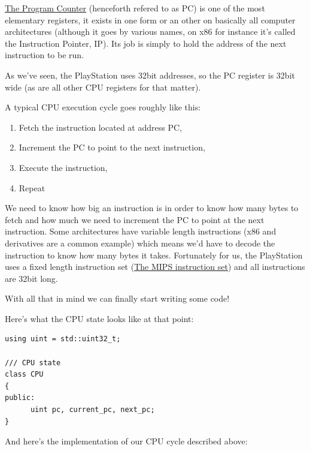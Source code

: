 \documentclass[a4paper]{article}
\begin{document}
\href{https://en.wikipedia.org/wiki/Program_counter}{The Program
  Counter} (henceforth refered to as PC) is one of the most
elementary registers, it exists in one form or an other on basically
all computer architectures (although it goes by various names, on x86
for instance it's called the Instruction Pointer, IP). Its
job is simply to hold the address of the next instruction to be run.

As we've seen, the PlayStation uses 32bit addresses, so the PC
register is 32bit wide (as are all other CPU registers for that
matter).

A typical CPU execution cycle goes roughly like this:

\begin{enumerate}
  \item Fetch the instruction located at address PC,
  \item Increment the PC to point to the next instruction,
  \item Execute the instruction,
  \item Repeat
\end{enumerate}

We need to know how big an instruction is in order to know how many
bytes to fetch and how much we need to increment the PC to
point at the next instruction. Some architectures have variable length
instructions (x86 and derivatives are a common example) which means
we'd have to decode the instruction to know how many bytes it
takes. Fortunately for us, the PlayStation uses a fixed length
instruction set
(\href{https://en.wikipedia.org/wiki/MIPS_instruction_set}{The MIPS
  instruction set}) and all instructions are 32bit long.

With all that in mind we can finally start writing some code!

Here's what the CPU state looks like at that point:

\begin{lstlisting}[label={code:cpupc}]
using uint = std::uint32_t;
  
/// CPU state
class CPU
{
public:
      uint pc, current_pc, next_pc;       
}   
\end{lstlisting}

And here's the implementation of our CPU cycle described above:
\end{document}
